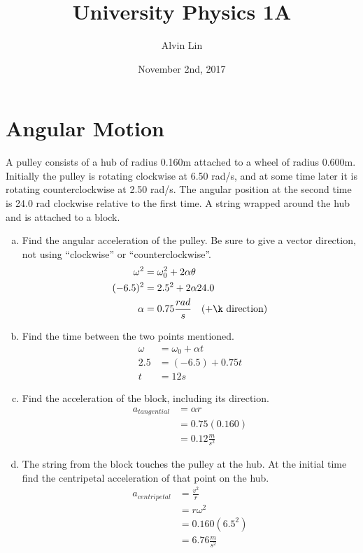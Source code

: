 \documentclass{math}
\title{University Physics 1A}
\author{Alvin Lin}
\date{November 2nd, 2017}
\begin{document}
\maketitle

\section*{Angular Motion}
A pulley consists of a hub of radius 0.160m attached to a wheel of radius
0.600m. Initially the pulley is rotating clockwise at 6.50 rad/s, and at some
time later it is rotating counterclockwise at 2.50 rad/s. The angular position
at the second time is 24.0 rad clockwise relative to the first time. A string
wrapped around the hub and is attached to a block.
\begin{enumerate}[(a)]
  \item Find the angular acceleration of the pulley. Be sure to give a vector
  direction, not using ``clockwise'' or ``counterclockwise''.
  \begin{align*}
    \omega^2 &= \omega_0^2+2\alpha\theta \\
    (-6.5)^2 &= 2.5^2+2\alpha24.0 \\
    \alpha &= 0.75\frac{rad}{s} \quad (+\k \text{ direction})
  \end{align*}
  \item Find the time between the two points mentioned.
  \begin{align*}
    \omega &= \omega_0+\alpha t \\
    2.5 &= (-6.5)+0.75t \\
    t &= 12s
  \end{align*}
  \item Find the acceleration of the block, including its direction.
  \begin{align*}
    a_{tangential} &= \alpha r \\
    &= 0.75(0.160) \\
    &= 0.12\frac{m}{s^2}
  \end{align*}
  \item The string from the block touches the pulley at the hub. At the initial
  time find the centripetal acceleration of that point on the hub.
  \begin{align*}
    a_{centripetal} &= \frac{v^2}{r} \\
    &= r\omega^2 \\
    &= 0.160(6.5^2) \\
    &= 6.76\frac{m}{s^2}
  \end{align*}
\end{enumerate}
\end{document}
